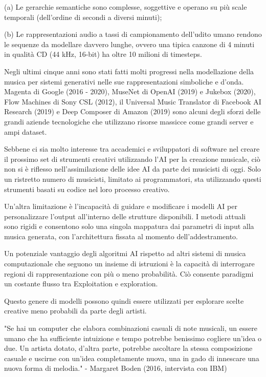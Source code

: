 \documentclass[a4paper,12pt]{report}
\begin{document}
(a) Le gerarchie semantiche sono complesse, soggettive e operano su più scale temporali (dell'ordine di secondi a diversi minuti);

(b) Le rappresentazioni audio a tassi di campionamento dell'udito umano rendono le sequenze da modellare davvero lunghe, ovvero una tipica canzone di 4 minuti in qualità CD (44 kHz, 16-bit) ha oltre 10 milioni di timesteps.

Negli ultimi cinque anni sono stati fatti molti progressi nella modellazione della musica per sistemi generativi nelle sue rappresentazioni simboliche e d'onda. 
Magenta di Google (2016 - 2020), MuseNet di OpenAI (2019) e Jukebox (2020), Flow Machines di Sony CSL (2012), il Universal Music Translator di Facebook AI Research (2019) e Deep Composer di Amazon (2019)
sono alcuni degli sforzi delle grandi aziende tecnologiche che utilizzano risorse massicce come grandi server e ampi dataset. 

Sebbene ci sia molto interesse tra accademici e sviluppatori di software nel creare il prossimo set di strumenti creativi utilizzando l'AI per la creazione musicale, 
ciò non si è riflesso nell'assimilazione delle idee AI da parte dei musicisti di oggi. 
Solo un ristretto numero di musicisti, limitato ai programmatori, sta utilizzando questi strumenti basati su codice nel loro processo creativo.

Un'altra limitazione è l'incapacità di guidare e modificare i modelli AI per personalizzare l'output all'interno delle strutture disponibili. 
I metodi attuali sono rigidi e consentono solo una singola mappatura dai parametri di input alla musica generata, con l'architettura fissata al momento dell'addestramento. 

Un potenziale vantaggio degli algoritmi AI rispetto ad altri sistemi di musica computazionale che seguono un insieme di istruzioni è la capacità di interrogare regioni di rappresentazione con più o meno probabilità. 
Ciò consente paradigmi un costante flusso tra Exploitation e exploration. 

Questo genere di modelli possono quindi essere utilizzati per esplorare scelte creative meno probabili da parte degli artisti.

"Se hai un computer che elabora combinazioni casuali di note musicali, un essere umano che ha sufficiente intuizione e tempo potrebbe benissimo cogliere un'idea o due. 
Un artista dotato, d'altra parte, potrebbe ascoltare la stessa composizione casuale e uscirne con un'idea completamente nuova, una in gado di innescare una nuova forma di melodia."
- Margaret Boden (2016, intervista con IBM)
\end{document}
